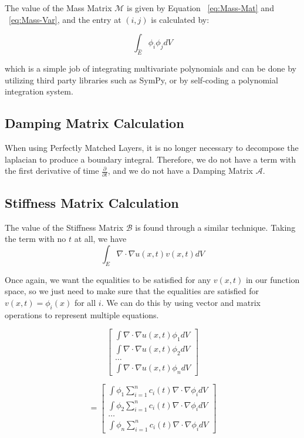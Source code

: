 The value of the Mass Matrix $\mathcal{M}$ is given by Equation ~\ref{eq:Mass-Mat} and ~\ref{eq:Mass-Var}, and the entry at $(i,j)$ is calculated by:

\begin{equation}
\label{eq:Mass-Eq}
\int_{\hat{E}} \phi_i \phi_j dV
\end{equation}

which is a simple job of integrating multivariate polynomials and can be done by utilizing third party libraries such as SymPy, or by self-coding a polynomial integration system.
 
\subsection{Damping Matrix Calculation}

When using Perfectly Matched Layers, it is no longer necessary to decompose the laplacian to produce a boundary integral. Therefore, we do not have a term with the first derivative of time $\frac{\partial}{\partial t}$, and we do not have a Damping Matrix $\mathcal{A}$.

\subsection{Stiffness Matrix Calculation}

The value of the Stiffness Matrix $\mathcal{B}$ is found through a similar technique. Taking the term with no $t$ at all, we have 
\begin{equation}
\int_E \nabla \cdot \nabla u(x,t) v(x,t) dV
\end{equation}

Once again, we want the equalities to be satisfied for any $v(x,t)$ in our function space, so we just need to make sure that the equalities are satisfied for $v(x,t) = \phi_i(x)$ for all $i$. We can do this by using vector and matrix operations to represent multiple equations.

\begin{equation}
\begin{bmatrix}
\int \nabla \cdot \nabla u(x,t) \phi_1 dV \\
\int \nabla \cdot \nabla u(x,t) \phi_2 dV \\
\ldots \\
\int \nabla \cdot \nabla u(x,t) \phi_n dV
\end{bmatrix}
\end{equation}


\begin{equation}
= \begin{bmatrix}
\int \phi_1 \sum\limits_{i=1}^n c_i(t) \nabla \cdot \nabla \phi_i dV \\
\int \phi_2 \sum\limits_{i=1}^n c_i(t) \nabla \cdot \nabla \phi_i dV \\
\ldots \\
\int \phi_n \sum\limits_{i=1}^n c_i(t) \nabla \cdot \nabla \phi_i dV
\end{bmatrix}
\end{equation}

